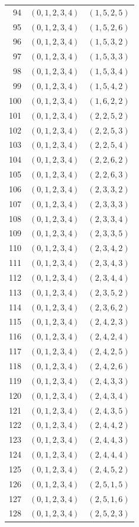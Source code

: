 \documentclass[11pt,a4paper]{article}
\theoremstyle{definition}
\theoremstyle{remark}
\begin{document}
\begin{longtable}{rll}
94 & $(0,1,2,3,4)$ & $(1,5,2,5)$\\
95 & $(0,1,2,3,4)$ & $(1,5,2,6)$\\
96 & $(0,1,2,3,4)$ & $(1,5,3,2)$\\
97 & $(0,1,2,3,4)$ & $(1,5,3,3)$\\
98 & $(0,1,2,3,4)$ & $(1,5,3,4)$\\
99 & $(0,1,2,3,4)$ & $(1,5,4,2)$\\
100 & $(0,1,2,3,4)$ & $(1,6,2,2)$\\
101 & $(0,1,2,3,4)$ & $(2,2,5,2)$\\
102 & $(0,1,2,3,4)$ & $(2,2,5,3)$\\
103 & $(0,1,2,3,4)$ & $(2,2,5,4)$\\
104 & $(0,1,2,3,4)$ & $(2,2,6,2)$\\
105 & $(0,1,2,3,4)$ & $(2,2,6,3)$\\
106 & $(0,1,2,3,4)$ & $(2,3,3,2)$\\
107 & $(0,1,2,3,4)$ & $(2,3,3,3)$\\
108 & $(0,1,2,3,4)$ & $(2,3,3,4)$\\
109 & $(0,1,2,3,4)$ & $(2,3,3,5)$\\
110 & $(0,1,2,3,4)$ & $(2,3,4,2)$\\
111 & $(0,1,2,3,4)$ & $(2,3,4,3)$\\
112 & $(0,1,2,3,4)$ & $(2,3,4,4)$\\
113 & $(0,1,2,3,4)$ & $(2,3,5,2)$\\
114 & $(0,1,2,3,4)$ & $(2,3,6,2)$\\
115 & $(0,1,2,3,4)$ & $(2,4,2,3)$\\
116 & $(0,1,2,3,4)$ & $(2,4,2,4)$\\
117 & $(0,1,2,3,4)$ & $(2,4,2,5)$\\
118 & $(0,1,2,3,4)$ & $(2,4,2,6)$\\
119 & $(0,1,2,3,4)$ & $(2,4,3,3)$\\
120 & $(0,1,2,3,4)$ & $(2,4,3,4)$\\
121 & $(0,1,2,3,4)$ & $(2,4,3,5)$\\
122 & $(0,1,2,3,4)$ & $(2,4,4,2)$\\
123 & $(0,1,2,3,4)$ & $(2,4,4,3)$\\
124 & $(0,1,2,3,4)$ & $(2,4,4,4)$\\
125 & $(0,1,2,3,4)$ & $(2,4,5,2)$\\
126 & $(0,1,2,3,4)$ & $(2,5,1,5)$\\
127 & $(0,1,2,3,4)$ & $(2,5,1,6)$\\
128 & $(0,1,2,3,4)$ & $(2,5,2,3)$\\

\end{longtable}
\end{document}
